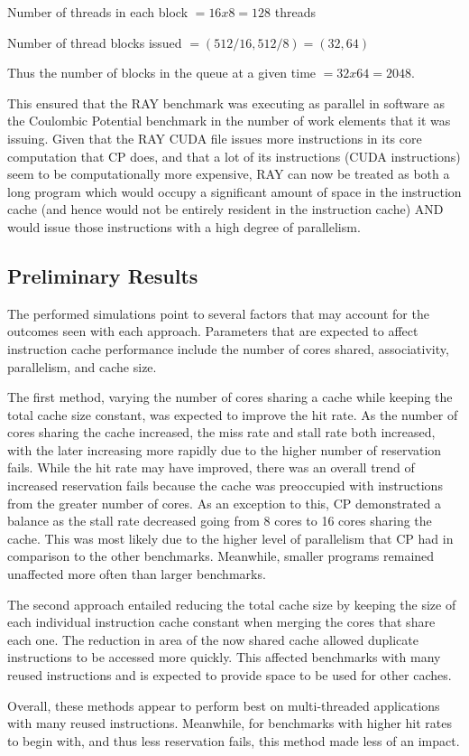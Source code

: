 Number of threads in each block $= 16 x 8 = 128$ threads

Number of thread blocks issued $= (512/16, 512/8) = (32, 64)$

Thus the number of blocks in the queue at a given time $= 32 x 64 = 2048.$

This ensured that the RAY benchmark was executing as parallel in
software as the Coulombic Potential benchmark in the number of work
elements that it was issuing. 
Given that the RAY CUDA file issues more instructions in its core
computation that CP does, and that a lot of its instructions (CUDA
instructions) seem to be computationally more expensive, RAY can now
be treated as both a long program which would occupy a significant
amount of space in the instruction cache (and hence would not be
entirely resident in the instruction cache) AND would issue those
instructions with a high degree of parallelism.

\subsection{Preliminary Results}

The performed simulations point to several factors that may account 
for the outcomes seen with each approach. Parameters that are expected 
to affect instruction cache performance include the number of cores 
shared, associativity, parallelism, and cache size.

The first method, varying the number of cores sharing a cache while 
keeping the total cache size constant, was expected to improve the hit 
rate. As the number of cores sharing the cache increased, the miss rate 
and stall rate both increased, with the later increasing more rapidly 
due to the higher number of reservation fails. While the hit rate may 
have improved, there was an overall trend of increased reservation fails 
because the cache was preoccupied with instructions from the greater 
number of cores. As an exception to this, CP demonstrated a balance as 
the stall rate decreased going from 8 cores to 16 cores sharing the 
cache. This was most likely due to the higher level of parallelism that 
CP had in comparison to the other benchmarks. Meanwhile, smaller programs 
remained unaffected more often than larger benchmarks.

The second approach entailed reducing the total cache size by keeping 
the size of each individual instruction cache constant when merging the 
cores that share each one. The reduction in area of the now shared cache 
allowed duplicate instructions to be accessed more quickly. This 
affected benchmarks with many reused instructions and is expected to 
provide space to be used for other caches.

Overall, these methods appear to perform best on multi-threaded 
applications with many reused instructions. Meanwhile, for benchmarks 
with higher hit rates to begin with, and thus less reservation fails, 
this method made less of an impact.
